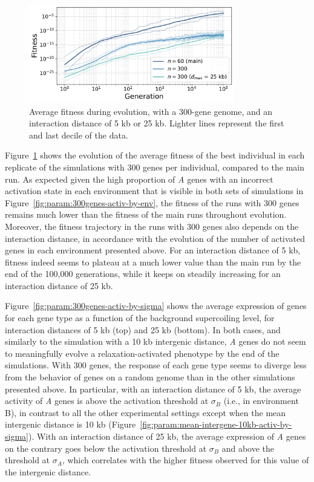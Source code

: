 \begin{figure}[H]
\centering
\includegraphics[width=0.8\textwidth]{param/300-genes/fitness_all_with_main.pdf}
\caption[Average fitness during evolution, with a 300-gene genome]{Average fitness during evolution, with a 300-gene genome, and an interaction distance of 5 kb or 25 kb.
Lighter lines represent the first and last decile of the data.}
\label{fig:param:300gene-fitness}
\end{figure}

Figure~\ref{fig:param:300gene-fitness} shows the evolution of the average fitness of the best individual in each replicate of the simulations with 300 genes per individual, compared to the main run.
As expected given the high proportion of \emph{A} genes with an incorrect activation state in each environment that is visible in both sets of simulations in Figure~\ref{fig:param:300genes-activ-by-env}, the fitness of the runs with 300 genes remains much lower than the fitness of the main runs throughout evolution.
Moreover, the fitness trajectory in the runs with 300 genes also depends on the interaction distance, in accordance with the evolution of the number of activated genes in each environment presented above.
For an interaction distance of 5 kb, fitness indeed seems to plateau at a much lower value than the main run by the end of the 100,000 generations, while it keeps on steadily increasing for an interaction distance of 25 kb.

Figure~\ref{fig:param:300genes-activ-by-sigma} shows the average expression of genes for each gene type as a function of the background supercoiling level, for interaction distances of 5 kb (top) and 25 kb (bottom).
In both cases, and similarly to the simulation with a 10 kb intergenic distance, \emph{A} genes do not seem to meaningfully evolve a relaxation-activated phenotype by the end of the simulations.
With 300 genes, the response of each gene type seems to diverge less from the behavior of genes on a random genome than in the other simulations presented above.
In particular, with an interaction distance of 5 kb, the average activity of \emph{A} genes is above the activation threshold at $\sigma_B$ (i.e., in environment B), in contrast to all the other experimental settings except when the mean intergenic distance is 10 kb (Figure~\ref{fig:param:mean-intergene-10kb-activ-by-sigma}).
With an interaction distance of 25 kb, the average expression of \emph{A} genes on the contrary goes below the activation threshold at $\sigma_B$ and above the threshold at $\sigma_A$, which correlates with the higher fitness observed for this value of the intergenic distance.

